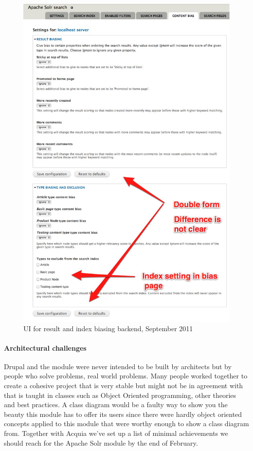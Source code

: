 \begin{figure}[H]
     \includegraphics[width=\textwidth/(2)]{images/apachesolr_ui_backend_september_2011_4.jpg}
     \caption{UI for result and index biasing backend, September 2011}
\end{figure}

\paragraph{Architectural challenges}
Drupal and the module were never intended to be built by architects but by people who solve problems, real world problems. Many people worked together to create a cohesive project that is very stable but might not be in agreement with that is taught in classes such as Object Oriented programming, other theories and best practices. A class diagram would be a faulty way to show you the beauty this module has to offer its users since there were hardly object oriented concepts applied to this module that were worthy enough to show a class diagram from. Together with Acquia we've set up a list of minimal achievements we should reach for the Apache Solr module by the end of  February. 

